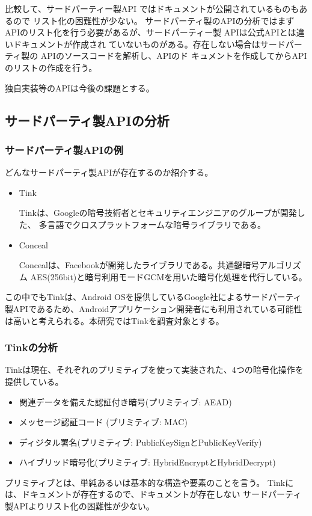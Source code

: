 比較して、サードパーティー製API
ではドキュメントが公開されているものもあるので
リスト化の困難性が少ない。
サードパーティ製のAPIの分析ではまずAPIのリスト化を行う必要があるが、サードパーティー製
APIは公式APIとは違いドキュメントが作成され
ていないものがある。存在しない場合はサードパー
ティ製の APIのソースコードを解析し、APIのド
キュメントを作成してからAPIのリストの作成を行う。

独自実装等のAPIは今後の課題とする。

\subsection{サードパーティ製APIの分析}

\subsubsection{サードパーティ製APIの例}
どんなサードパーティ製APIが存在するのか紹介する。
\begin{itemize}
\item Tink　

Tinkは、Googleの暗号技術者とセキュリティエンジニアのグループが開発した、
多言語でクロスプラットフォームな暗号ライブラリである。

\item Conceal

Concealは、Facebookが開発したライブラリである。共通鍵暗号アルゴリズム AES(256bit)と暗号利用モードGCMを用いた暗号化処理を代行している。
 
\end{itemize}
この中でもTinkは、Android OSを提供しているGoogle社によるサードパーティ製APIであるため、Androidアプリケーション開発者にも利用されている可能性は高いと考えられる。本研究ではTinkを調査対象とする。

\subsubsection{Tinkの分析}

Tinkは現在、それぞれのプリミティブを使って実装された、4つの暗号化操作を提供している。
\begin{itemize}
\item 関連データを備えた認証付き暗号(プリミティブ: AEAD)
\item メッセージ認証コード (プリミティブ: MAC)
\item ディジタル署名(プリミティブ: PublicKeySignとPublicKeyVerify)
\item ハイブリッド暗号化(プリミティブ: HybridEncryptとHybridDecrypt)
\end{itemize}
プリミティブとは、単純あるいは基本的な構造や要素のことを言う。
Tinkには、ドキュメントが存在するので、ドキュメントが存在しない
サードパーティ製APIよりリスト化の困難性が少ない。

